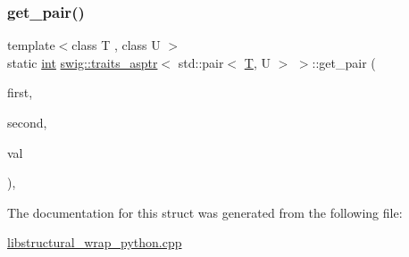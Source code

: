 \subsubsection{\texorpdfstring{get\+\_\+pair()}{get\_pair()}}
{\footnotesize\ttfamily template$<$class T , class U $>$ \\
static \hyperlink{lp__lib_8h_adeb9ec6400320e4923ac9d836d509ddb}{int} \hyperlink{structswig_1_1traits__asptr}{swig\+::traits\+\_\+asptr}$<$ std\+::pair$<$ \hyperlink{fmt_8h_a0acb682b8260ab1c60b918599864e2e5}{T}, U $>$ $>$\+::get\+\_\+pair (\begin{DoxyParamCaption}\item[{Py\+Object $\ast$}]{first,  }\item[{Py\+Object $\ast$}]{second,  }\item[{std\+::pair$<$ \hyperlink{fmt_8h_a0acb682b8260ab1c60b918599864e2e5}{T}, U $>$ $\ast$$\ast$}]{val }\end{DoxyParamCaption})\hspace{0.3cm}{\ttfamily [inline]}, {\ttfamily [static]}}



The documentation for this struct was generated from the following file\+:\begin{DoxyCompactItemize}
\item 
\hyperlink{libstructural__wrap__python_8cpp}{libstructural\+\_\+wrap\+\_\+python.\+cpp}\end{DoxyCompactItemize}
